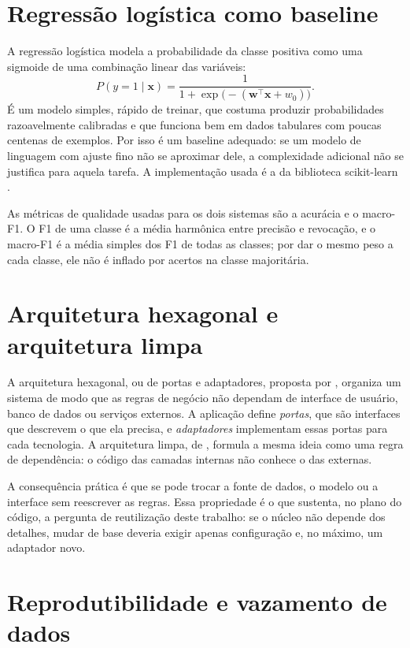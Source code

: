 \section{Regressão logística como baseline}

A regressão logística modela a probabilidade da classe positiva como uma sigmoide de uma combinação linear das variáveis:
\begin{equation}
  P(y=1 \mid \mathbf{x}) = \frac{1}{1 + \exp\!\big(-(\mathbf{w}^\top \mathbf{x} + w_0)\big)}.
\end{equation}
É um modelo simples, rápido de treinar, que costuma produzir probabilidades razoavelmente calibradas e que funciona bem em dados tabulares com poucas centenas de exemplos. Por isso é um baseline adequado: se um modelo de linguagem com ajuste fino não se aproximar dele, a complexidade adicional não se justifica para aquela tarefa. A implementação usada é a da biblioteca scikit-learn \cite{pedregosa2011}.

As métricas de qualidade usadas para os dois sistemas são a acurácia e o macro-F1. O F1 de uma classe é a média harmônica entre precisão e revocação, e o macro-F1 é a média simples dos F1 de todas as classes; por dar o mesmo peso a cada classe, ele não é inflado por acertos na classe majoritária.

\section{Arquitetura hexagonal e arquitetura limpa}
\label{sec:arquitetura-teoria}

A arquitetura hexagonal, ou de portas e adaptadores, proposta por , organiza um sistema de modo que as regras de negócio não dependam de interface de usuário, banco de dados ou serviços externos. A aplicação define \emph{portas}, que são interfaces que descrevem o que ela precisa, e \emph{adaptadores} implementam essas portas para cada tecnologia. A arquitetura limpa, de , formula a mesma ideia como uma regra de dependência: o código das camadas internas não conhece o das externas.

A consequência prática é que se pode trocar a fonte de dados, o modelo ou a interface sem reescrever as regras. Essa propriedade é o que sustenta, no plano do código, a pergunta de reutilização deste trabalho: se o núcleo não depende dos detalhes, mudar de base deveria exigir apenas configuração e, no máximo, um adaptador novo.

\section{Reprodutibilidade e vazamento de dados}

